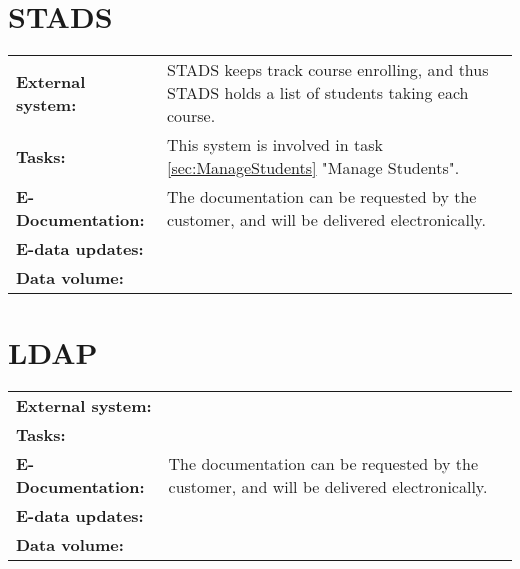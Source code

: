 \documentclass[Main]{subfiles}
\begin{document}
\section{STADS}\label{sec:STADS}
\begin{tabular}{l  p{13cm}}
 \textbf{External system:} & STADS keeps track course enrolling, and thus STADS holds a list of students taking each course. \\
 \textbf{Tasks:} &  This system is involved in task \ref{sec:ManageStudents} "Manage Students".\\
 \textbf{E-Documentation:} & The documentation can be requested by the customer, and will be delivered electronically.\\
 \textbf{E-data updates:} & \\
 \textbf{Data volume:} & \\
\end{tabular}



\section{LDAP}\label{sec:LDAP}
\begin{tabular}{l  p{13cm}}
 \textbf{External system:} &  \\
 \textbf{Tasks:} &   \\
 \textbf{E-Documentation:} & The documentation can be requested by the customer, and will be delivered electronically. \\
 \textbf{E-data updates:} & \\
 \textbf{Data volume:} & \\
\end{tabular}
\end{document}

